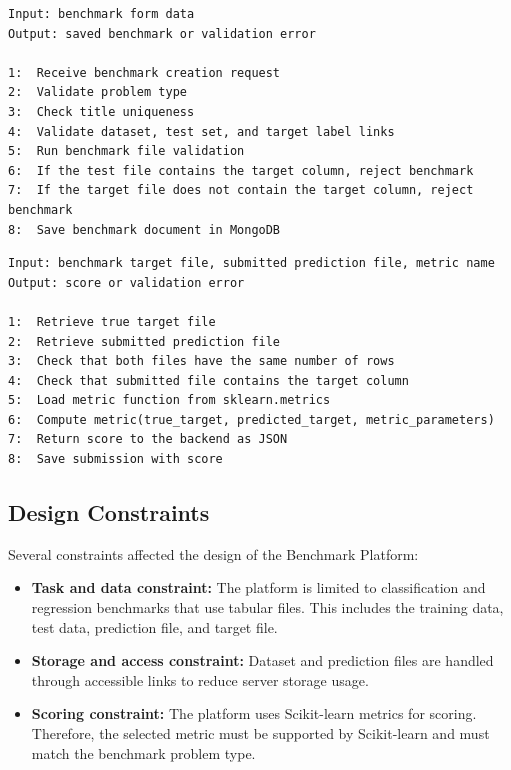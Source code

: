 \documentclass[12pt,a4paper]{report}
\begin{document}
\begin{lstlisting}[style=algostyle,caption={Benchmark creation flow}]
Input: benchmark form data
Output: saved benchmark or validation error

1:  Receive benchmark creation request
2:  Validate problem type
3:  Check title uniqueness
4:  Validate dataset, test set, and target label links
5:  Run benchmark file validation
6:  If the test file contains the target column, reject benchmark
7:  If the target file does not contain the target column, reject benchmark
8:  Save benchmark document in MongoDB
\end{lstlisting}

\begin{lstlisting}[style=algostyle,caption={Submission scoring flow}]
Input: benchmark target file, submitted prediction file, metric name
Output: score or validation error

1:  Retrieve true target file
2:  Retrieve submitted prediction file
3:  Check that both files have the same number of rows
4:  Check that submitted file contains the target column
5:  Load metric function from sklearn.metrics
6:  Compute metric(true_target, predicted_target, metric_parameters)
7:  Return score to the backend as JSON
8:  Save submission with score
\end{lstlisting}

\subsection{Design Constraints}
\noindent Several constraints affected the design of the Benchmark Platform:

\begin{itemize}
  \item \textbf{Task and data constraint:} The platform is limited to
  classification and regression benchmarks that use tabular files. This includes
  the training data, test data, prediction file, and target file.

  \item \textbf{Storage and access constraint:} Dataset and prediction files are
  handled through accessible links to reduce server storage usage. 

 \item \textbf{Scoring constraint:} The platform uses Scikit-learn metrics for
scoring. Therefore, the selected metric must be supported by Scikit-learn and
must match the benchmark problem type.
\end{itemize}
\end{document}
